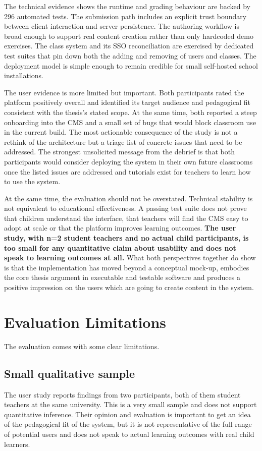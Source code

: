The technical evidence shows the runtime and grading behaviour are backed by 296 automated tests.
The submission path includes an explicit trust boundary between client interaction and server persistence.
The authoring workflow is broad enough to support real content creation rather than only hardcoded demo
exercises.
The class system and its SSO reconciliation are exercised by dedicated test suites that pin down both
the adding and removing of users and classes. The deployment model is simple enough to remain credible for small
self-hosted school installations.

The user evidence is more limited but important.
Both participants rated the platform positively overall and identified its target audience
and pedagogical fit consistent with the thesis's stated scope.
At the same time, both reported a steep onboarding into the CMS and a small set of bugs that would block classroom
use in the current build. The most actionable consequence of the study is not a rethink
of the architecture but a triage list of concrete issues that need to be addressed.
The strongest unsolicited message from the debrief is that both participants would consider
deploying the system in their own future classrooms once the listed issues are addressed and
tutorials exist for teachers to learn how to use the system.

At the same time, the evaluation should not be overstated. Technical stability is not equivalent
to educational effectiveness. A passing test suite does not prove that children understand the interface,
that teachers will find the CMS easy to adopt at scale or
that the platform improves learning outcomes. \textbf{The user study, with n=2 student teachers and no actual
child participants, is too small for any quantitative claim about usability and
does not speak to learning outcomes at all.}
What both perspectives together do show is that the implementation has moved beyond a conceptual mock-up,
embodies the core thesis argument in executable and testable software and produces a positive impression
on the users which are going to create content in the system.


\section{Evaluation Limitations}
The evaluation comes with some clear limitations.

\subsection*{Small qualitative sample}
The user study reports findings from two participants, both of them student teachers at the same university.
This is a very small sample and does not support quantitative inference.
Their opinion and evaluation is important to get an idea of the pedagogical fit of the system, but it is not representative of the full range of potential users and does not speak to actual learning outcomes with real child learners.

